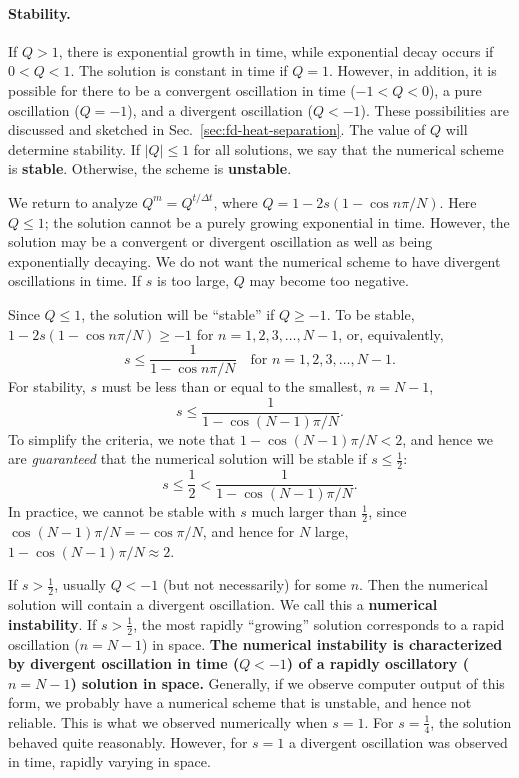 \paragraph{Stability.}
If $Q > 1$, there is exponential growth in time, while exponential decay occurs if $0 < Q < 1$.  The solution is constant in time if $Q = 1$.  However, in addition, it is possible for there to be a convergent oscillation in time ($-1 < Q < 0$), a pure oscillation ($Q = -1$), and a divergent oscillation ($Q < -1$).  These possibilities are discussed and sketched in Sec.~\ref{sec:fd-heat-separation}.  The value of $Q$ will determine stability.  If $|Q| \le 1$ for all solutions, we say that the numerical scheme is \textbf{stable}.  Otherwise, the scheme is \textbf{unstable}.

We return to analyze $Q^m = Q^{t/\Delta t}$, where $Q = 1 - 2s(1 - \cos n\pi/N)$.  Here $Q \le 1$; the solution cannot be a purely growing exponential in time.  However, the solution may be a convergent or divergent oscillation as well as being exponentially decaying.  We do not want the numerical scheme to have divergent oscillations in time.  If $s$ is too large, $Q$ may become too negative.

Since $Q \le 1$, the solution will be ``stable'' if $Q \ge -1$.  To be stable, $1 - 2s(1 - \cos n\pi/N) \ge -1$ for $n = 1, 2, 3, \ldots, N-1$, or, equivalently,
\[
s \le \frac{1}{1 - \cos n\pi/N} \quad \text{for } n = 1, 2, 3, \ldots, N-1.
\]
For stability, $s$ must be less than or equal to the smallest, $n = N-1$,
\[
s \le \frac{1}{1 - \cos(N-1)\pi/N}.
\]
To simplify the criteria, we note that $1 - \cos(N-1)\pi/N < 2$, and hence we are \emph{guaranteed} that the numerical solution will be stable if $s \le \frac{1}{2}$:
\begin{equation}
s \le \frac{1}{2} < \frac{1}{1 - \cos(N-1)\pi/N}.
\label{eq:6.3.26}
\end{equation}
In practice, we cannot be stable with $s$ much larger than $\frac{1}{2}$, since $\cos(N-1)\pi/N = -\cos\pi/N$, and hence for $N$ large, $1 - \cos(N-1)\pi/N \approx 2$.

If $s > \frac{1}{2}$, usually $Q < -1$ (but not necessarily) for some $n$.  Then the numerical solution will contain a divergent oscillation.  We call this a \textbf{numerical instability}.  If $s > \frac{1}{2}$, the most rapidly ``growing'' solution corresponds to a rapid oscillation ($n = N-1$) in space.  \textbf{The numerical instability is characterized by divergent oscillation in time ($Q < -1$) of a rapidly oscillatory ($n = N-1$) solution in space.}  Generally, if we observe computer output of this form, we probably have a numerical scheme that is unstable, and hence not reliable.  This is what we observed numerically when $s = 1$.  For $s = \frac{1}{4}$, the solution behaved quite reasonably.  However, for $s = 1$ a divergent oscillation was observed in time, rapidly varying in space.

